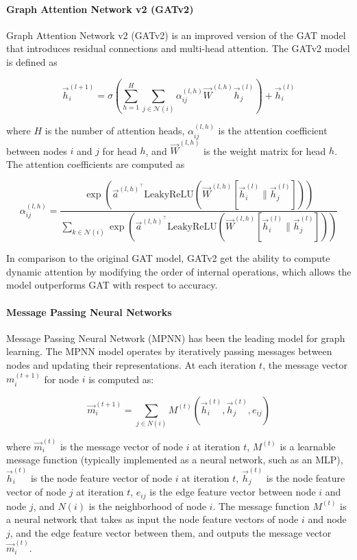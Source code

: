 \paragraph{Graph Attention Network v2 (GATv2)}
Graph Attention Network v2 (GATv2) \cite{brody2021attentive} is an improved version of the GAT model that introduces residual connections and multi-head attention. The GATv2 model is defined as

$$
    \vec{h}_i^{(l+1)} = \sigma \left( \sum_{h=1}^{H} \sum_{j \in \mathcal{N}(i)} \alpha_{ij}^{(l,h)} \vec{W}^{(l,h)} \vec{h}_j^{(l)} \right) + \vec{h}_i^{(l)}
$$

where $H$ is the number of attention heads, $\alpha_{ij}^{(l,h)}$ is the attention coefficient between nodes $i$ and $j$ for head $h$, and $\vec{W}^{(l,h)}$ is the weight matrix for head $h$. The attention coefficients are computed as

$$
    \alpha_{ij}^{(l,h)} = \frac{\exp \left( \vec{a}^{(l,h)^\top} \textrm{LeakyReLU} \left( \vec{W}^{(l,h)} [ \vec{h}_i^{(l)} \| \vec{h}_j^{(l)}] \right) \right)}{\sum_{k \in \mathcal{N}(i)} \exp \left( \vec{a}^{(l,h)^\top} \textrm{LeakyReLU} \left( \vec{W}^{(l,h)} [ \vec{h}_i^{(l)} \| \vec{h}_j^{(l)}] \right) \right)}
$$

In comparison to the original GAT model, GATv2 get the ability to compute dynamic attention by modifying the order of internal operations, which allows the model outperforms GAT with respect to accuracy.

\paragraph{Message Passing Neural Networks}
Message Passing Neural Network (MPNN) \newline \cite{gilmer2017neural} has been the leading model for graph learning. The MPNN model operates by iteratively passing messages between nodes and updating their representations. At each iteration $t$, the message vector $m_i^{(t+1)}$ for node $i$ is computed as:

$$
    \vec{m}_i^{(t+1)} = \sum_{j\in N(i)}M^{(t)}(\vec{h}_i^{(t)}, \vec{h}_j^{(t)}, e_{ij})
$$

where $\vec{m}_i^{(t)}$ is the message vector of node $i$ at iteration $t$, $M^{(t)}$ is a learnable message function (typically implemented as a neural network, such as an MLP), $\vec{h}_i^{(t)}$ is the node feature vector of node $i$ at iteration $t$, $\vec{h}_j^{(t)}$ is the node feature vector of node $j$ at iteration $t$, $e_{ij}$ is the edge feature vector between node $i$ and node $j$, and $N(i)$ is the neighborhood of node $i$. The message function $M^{(t)}$ is a neural network that takes as input the node feature vectors of node $i$ and node $j$, and the edge feature vector between them, and outputs the message vector $\vec{m}_i^{(t)}$.

